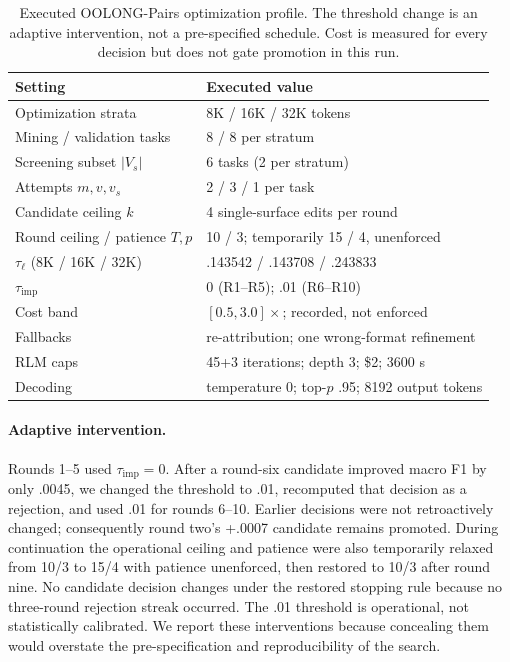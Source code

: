 \begin{table}[t]
\centering\scriptsize
\setlength{\tabcolsep}{3.5pt}
\begin{tabular}{@{}ll@{}}
\toprule
Setting & Executed value \\
\midrule
Optimization strata & 8K / 16K / 32K tokens \\
Mining / validation tasks & 8 / 8 per stratum \\
Screening subset $|V_s|$ & 6 tasks (2 per stratum) \\
Attempts $m,v,v_s$ & 2 / 3 / 1 per task \\
Candidate ceiling $k$ & 4 single-surface edits per round \\
Round ceiling / patience $T,p$ & 10 / 3; temporarily 15 / 4, unenforced \\
$\tau_\ell$ (8K / 16K / 32K) & .143542 / .143708 / .243833 \\
$\tau_{\mathrm{imp}}$ & 0 (R1--R5); .01 (R6--R10) \\
Cost band & $[0.5,3.0]\times$; recorded, not enforced \\
Fallbacks & re-attribution; one wrong-format refinement \\
RLM caps & 45+3 iterations; depth 3; \$2; 3600 s \\
Decoding & temperature 0; top-$p$ .95; 8192 output tokens \\
\bottomrule
\end{tabular}
\caption{Executed OOLONG-Pairs optimization profile. The threshold change is
an adaptive intervention, not a pre-specified schedule. Cost is measured for
every decision but does not gate promotion in this run.}
\label{tab:study-settings}
\end{table}

\paragraph{Adaptive intervention.}
Rounds 1--5 used $\tau_{\mathrm{imp}}=0$. After a round-six candidate improved
macro F1 by only .0045, we changed the threshold to .01, recomputed that
decision as a rejection, and used .01 for rounds 6--10. Earlier decisions were
not retroactively changed; consequently round two's +.0007 candidate remains
promoted. During continuation the operational ceiling and patience were also
temporarily relaxed from 10/3 to 15/4 with patience unenforced, then restored
to 10/3 after round nine. No candidate decision changes under the restored
stopping rule because no three-round rejection streak occurred. The .01
threshold is operational, not statistically calibrated. We report these
interventions because concealing them would overstate the pre-specification
and reproducibility of the search.

